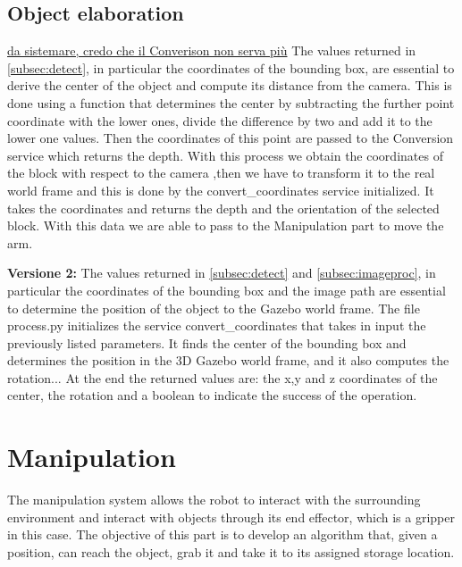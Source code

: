 \documentclass[12pt,a4paper]{article}
\begin{document}
\subsection{Object elaboration}\label{subsec:objel}
\uline{da sistemare, credo che il Converison non serva più}
The values returned in \ref{subsec:detect}, in particular the coordinates of the bounding box, are essential to derive the center of the object and compute its distance from the camera. This is done using a function that determines the center by subtracting the further point coordinate with the lower ones, divide the difference by two and add it to the lower one values. Then the coordinates of this point are passed to the Conversion service which returns the depth. With this process we obtain the coordinates of the block with respect to the camera ,then we have to transform it to the real world frame and this is done by the convert\_coordinates service initialized. It takes the coordinates and returns the depth and the orientation of the selected block. With this data we are able to pass to the Manipulation part to move the arm.

\textbf{Versione 2:} The values returned in \ref{subsec:detect} and \ref{subsec:imageproc}, in particular the coordinates of the bounding box and the image path are essential to determine the position of the object to the Gazebo world frame. The file process.py initializes the service convert\_coordinates that takes in input the previously listed parameters. It finds the center of the bounding box and determines the position in the 3D Gazebo world frame, and it also computes the rotation... At the end the returned values are: the x,y and z coordinates of the center, the rotation and a boolean to indicate the success of the operation.


\section{Manipulation}\label{sec:manipulation}
The manipulation system allows the robot to interact with the surrounding environment and interact with objects through its end effector, which is a gripper in this case.
The objective of this part is to develop an algorithm that, given a position, can reach the object, grab it and take it to its assigned storage location.
\end{document}
